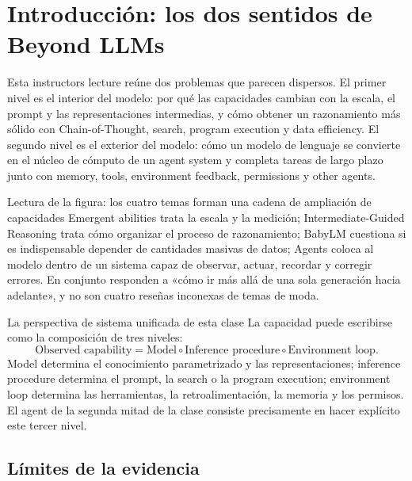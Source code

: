 \section{Introducción: los dos sentidos de Beyond LLMs}

Esta instructors lecture reúne dos problemas que parecen dispersos. El primer nivel es el interior del modelo: por qué las capacidades cambian con la escala, el prompt y las representaciones intermedias, y cómo obtener un razonamiento más sólido con Chain-of-Thought, search, program execution y data efficiency. El segundo nivel es el exterior del modelo: cómo un modelo de lenguaje se convierte en el núcleo de cómputo de un agent system y completa tareas de largo plazo junto con memory, tools, environment feedback, permissions y other agents.


\begin{knowledgebox}{Lectura de la figura: los cuatro temas forman una cadena de ampliación de capacidades}
Emergent abilities trata la escala y la medición; Intermediate-Guided Reasoning trata cómo organizar el proceso de razonamiento; BabyLM cuestiona si es indispensable depender de cantidades masivas de datos; Agents coloca al modelo dentro de un sistema capaz de observar, actuar, recordar y corregir errores. En conjunto responden a «cómo ir más allá de una sola generación hacia adelante», y no son cuatro reseñas inconexas de temas de moda.
\end{knowledgebox}

\begin{importantbox}{La perspectiva de sistema unificada de esta clase}
La capacidad puede escribirse como la composición de tres niveles:
\[
\text{Observed capability}
=\text{Model}
\circ\text{Inference procedure}
\circ\text{Environment loop}.
\]
Model determina el conocimiento parametrizado y las representaciones; inference procedure determina el prompt, la search o la program execution; environment loop determina las herramientas, la retroalimentación, la memoria y los permisos. El agent de la segunda mitad de la clase consiste precisamente en hacer explícito este tercer nivel.
\end{importantbox}

\subsection{Límites de la evidencia}

